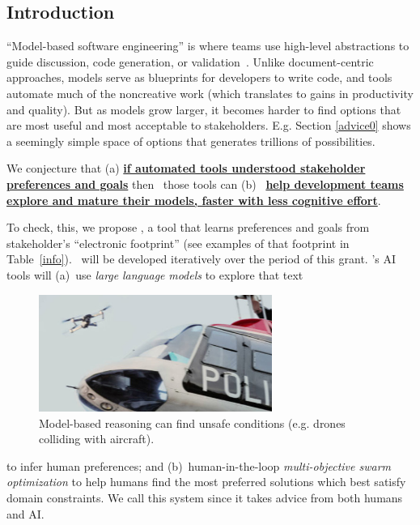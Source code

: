 \documentclass[twoside]{NSF}
\newcommand{\IT}{{\sffamily {\em \mbox{ADVICE}}}}
\begin{document}
\begin{nsfdescription}
\section{Introduction} 


``Model-based software engineering''  is where teams use high-level abstractions to guide discussion, code generation, or validation~\cite{8804427}.
Unlike document-centric
approaches, models serve as blueprints for developers to write code, and tools automate
much of the noncreative work (which translates to gains
in productivity and quality).
But
as models grow larger, it becomes harder to find  options that are most useful and most acceptable to  stakeholders.  E.g.
Section \ref{advice0} shows a seemingly simple space of options that generates trillions of possibilities.

We conjecture that    (a)
\underline{\bf if automated tools    understood stakeholder preferences and  goals} then  ~those tools can   (b)~
\underline{\bf help  development teams     explore and mature their models, faster
with   less cognitive effort}.

To check, this,   we propose
{\IT}, a tool that learns  preferences and goals from
stakeholder's ``electronic footprint'' (see examples
of that footprint in  Table~\ref{info}). \IT ~will be developed iteratively over the period of this grant.  {\IT}'s AI tools will   (a)~use  {\em large}  {\em language}  {\em models} to explore that text
\begin{figure}
\includegraphics[width=3in]{fig/heli.png}
\caption{Model-based reasoning can find unsafe conditions
(e.g. drones   colliding      with     aircraft).}
\end{figure} 
     to infer human preferences;
 and (b)~human-in-the-loop {\em multi-objective swarm optimization } 
to help humans find the most preferred solutions
which best satisfy domain constraints.
We call this system 
{\IT}
since it takes advice    from both humans and AI. 




\end{nsfdescription}
\end{document}
